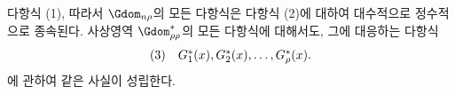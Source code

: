 
다항식 (1), 따라서 $\Gdom_{n\rho}$의 모든 다항식은 다항식 (2)에 대하여 대수적으로 정수적으로 종속된다. 사상영역 $\Gdom^*_{\rho\rho}$의 모든 다항식에 대해서도, 그에 대응하는 다항식
\[
\begin{array}{@{}l@{\quad}c@{}}
(3)& G_1^*(x),G_2^*(x),\ldots,G_\rho^*(x).
\end{array}
\]
에 관하여 같은 사실이 성립한다.
